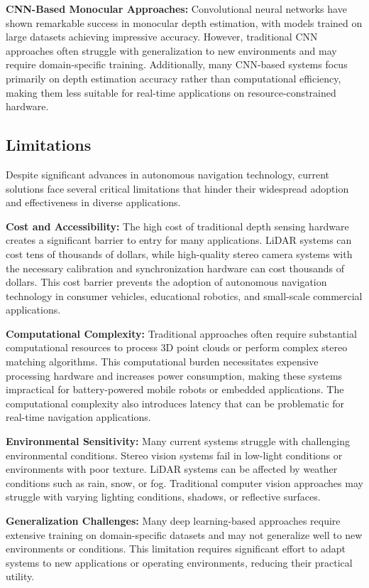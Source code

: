 \documentclass[conference]{IEEEtran}
\begin{document}
\textbf{CNN-Based Monocular Approaches:} Convolutional neural networks have shown remarkable success in monocular depth estimation, with models trained on large datasets achieving impressive accuracy. However, traditional CNN approaches often struggle with generalization to new environments and may require domain-specific training. Additionally, many CNN-based systems focus primarily on depth estimation accuracy rather than computational efficiency, making them less suitable for real-time applications on resource-constrained hardware.

\subsection{Limitations}
Despite significant advances in autonomous navigation technology, current solutions face several critical limitations that hinder their widespread adoption and effectiveness in diverse applications.

\textbf{Cost and Accessibility:} The high cost of traditional depth sensing hardware creates a significant barrier to entry for many applications. LiDAR systems can cost tens of thousands of dollars, while high-quality stereo camera systems with the necessary calibration and synchronization hardware can cost thousands of dollars. This cost barrier prevents the adoption of autonomous navigation technology in consumer vehicles, educational robotics, and small-scale commercial applications.

\textbf{Computational Complexity:} Traditional approaches often require substantial computational resources to process 3D point clouds or perform complex stereo matching algorithms. This computational burden necessitates expensive processing hardware and increases power consumption, making these systems impractical for battery-powered mobile robots or embedded applications. The computational complexity also introduces latency that can be problematic for real-time navigation applications.

\textbf{Environmental Sensitivity:} Many current systems struggle with challenging environmental conditions. Stereo vision systems fail in low-light conditions or environments with poor texture. LiDAR systems can be affected by weather conditions such as rain, snow, or fog. Traditional computer vision approaches may struggle with varying lighting conditions, shadows, or reflective surfaces.

\textbf{Generalization Challenges:} Many deep learning-based approaches require extensive training on domain-specific datasets and may not generalize well to new environments or conditions. This limitation requires significant effort to adapt systems to new applications or operating environments, reducing their practical utility.
\end{document}
